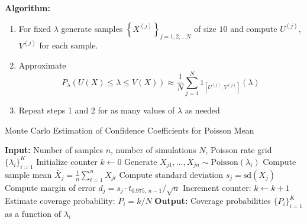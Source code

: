 \documentclass[8pt]{beamer}
\begin{document}
\begin{frame}

{\bf Algorithm:}

\begin{enumerate}

\item For fixed $\lambda$ generate samples $\left\{X^{(j)} \right\}_{j=1,2,...N}$ of size $10$ and compute $U^{(j)}$, $V^{(j)}$ for each sample.

\item Approximate \[P_\lambda(U(X)\leq \lambda \leq V(X)) \approx \frac{1}{N}\sum_{j=1}^N 1_{\left[U^{(j)}, V^{(j)}\right]}(\lambda)\]

\item Repeat steps 1 and 2 for as many values of $\lambda$ as needed

\end{enumerate}
\end{frame}

\begin{frame}
\begin{algorithm}[H]
\caption{Monte Carlo Estimation of Confidence Coefficients for Poisson Mean}
\label{alg:poisson-confidence}
\begin{algorithmic}[1]
  \State \textbf{Input:} Number of samples $n$, number of simulations $N$, Poisson rate grid $\{\lambda_i\}_{i=1}^K$
    \State Initialize counter $k \gets 0$
      \State Generate $X_{j1}, \ldots, X_{jn} \sim \text{Poisson}(\lambda_i)$
      \State Compute sample mean $\bar{X}_j = \frac{1}{n} \sum_{t=1}^{n} X_{jt}$
      \State Compute standard deviation $s_j = \text{sd}(X_j)$
      \State Compute margin of error $d_j = s_j \cdot t_{0.975,\, n-1} / \sqrt{n}$
        \State Increment counter: $k \gets k + 1$
      \EndIf
    \EndFor
    \State Estimate coverage probability: $P_i = k / N$
  \EndFor
  \State \textbf{Output:} Coverage probabilities $\{P_i\}_{i=1}^K$ as a function of $\lambda_i$
\end{algorithmic}
\end{algorithm}
\end{frame}
\end{document}
